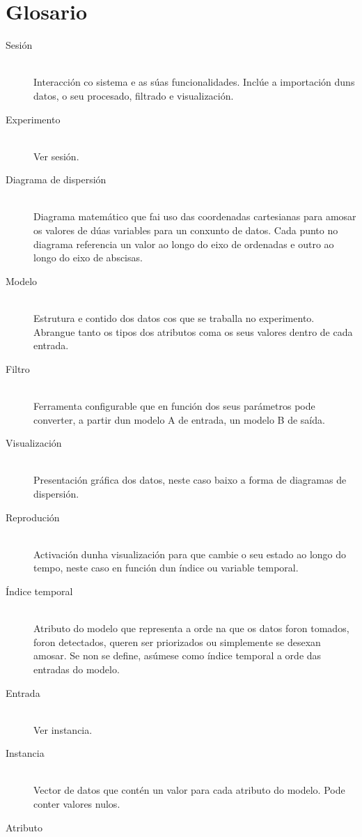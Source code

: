 \pagestyle{plain}
\chapter*{Glosario}
\begin{description}
  \item[Sesión] \hfill \\
  Interacción co sistema e as súas funcionalidades. Inclúe a importación duns datos, o seu procesado, filtrado e visualización.
  \item[Experimento] \hfill \\
  Ver sesión.
	\item[Diagrama de dispersión] \hfill \\
  Diagrama matemático que fai uso das coordenadas cartesianas para amosar os valores de dúas variables para un conxunto de datos. Cada punto no diagrama referencia un valor ao longo do eixo de ordenadas e outro ao longo do eixo de abscisas.
	\item[Modelo] \hfill \\
  Estrutura e contido dos datos cos que se traballa no experimento. Abrangue tanto os tipos dos atributos coma os seus valores dentro de cada entrada.
	\item[Filtro] \hfill \\
  Ferramenta configurable que en función dos seus parámetros pode converter, a partir dun modelo A de entrada, un modelo B de saída.
	\item[Visualización] \hfill \\
  Presentación gráfica dos datos, neste caso baixo a forma de diagramas de dispersión.
	\item[Reprodución] \hfill \\
  Activación dunha visualización para que cambie o seu estado ao longo do tempo, neste caso en función dun índice ou variable temporal.
	\item[Índice temporal] \hfill \\
  Atributo do modelo que representa a orde na que os datos foron tomados, foron detectados, queren ser priorizados ou simplemente se desexan amosar. Se non se define, asúmese como índice temporal a orde das entradas do modelo.
	\item[Entrada] \hfill \\
  Ver instancia.
	\item[Instancia] \hfill \\
  Vector de datos que contén un valor para cada atributo do modelo. Pode conter valores nulos.
	\item[Atributo] \hfill \\

\end{description}
